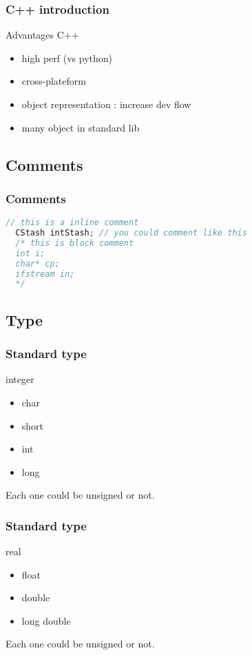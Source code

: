 \documentclass{beamer}
\begin{document}
\begin{frame}
  \frametitle{C++ introduction}
  \begin{block}{Advantages C++}
    \begin{itemize}
		\item high perf (vs python)
		\item cross-plateform
		\item object representation : increase dev flow
		\item many object in standard lib
    \end{itemize}
  \end{block}
\end{frame}

\subsection{Comments}
\label{sub:comments}

\begin{frame}[fragile]
  \frametitle{Comments}
\begin{lstlisting}[language=C++,keywordstyle=\color{red}]
  // this is a inline comment
  CStash intStash; // you could comment like this
  /* this is block comment
  int i;
  char* cp;
  ifstream in;
  */
\end{lstlisting}
\end{frame}
\subsection{Type}
\label{sub:type}


\begin{frame}
  \frametitle{Standard type}
  \begin{block}{integer}
    \begin{itemize}
		\item char
		\item short
		\item int
		\item long
    \end{itemize}
	Each one could be unsigned or not.
  \end{block}
\end{frame}

\begin{frame}
  \frametitle{Standard type}
  \begin{block}{real}
    \begin{itemize}
		\item float
		\item double
		\item long double
    \end{itemize}
	Each one could be unsigned or not.
  \end{block}
\end{frame}
\end{document}
